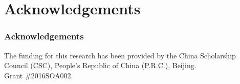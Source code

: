 \documentclass[pdflatex,compress,10pt,
	xcolor={dvipsnames,dvipsnames,svgnames,x11names,table},
	hyperref={colorlinks = true,breaklinks = true, urlcolor = NavyBlue, breaklinks = true}]{beamer}
\begin{document}
\section{Acknowledgements}
\begin{frame}\frametitle{Acknowledgements}
The funding for this research has been provided by the China Scholarship Council (CSC), People’s Republic of China (P.R.C.), Beijing.\\ Grant \#2016SOA002.
\end{frame}
\end{document}
